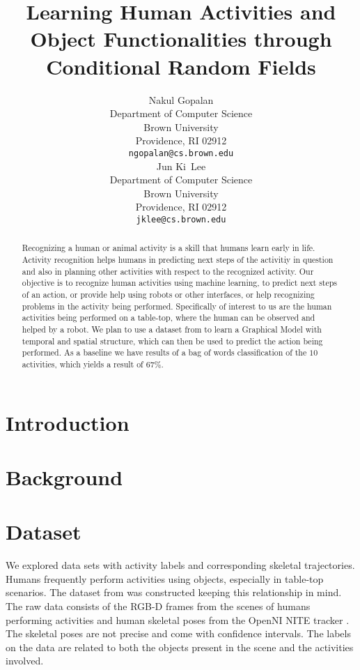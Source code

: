 \documentclass{article} %
\title{Learning Human Activities and Object Functionalities through Conditional Random Fields}
\author{
Nakul Gopalan\\
Department of Computer Science\\
Brown University\\
Providence, RI 02912 \\
\texttt{ngopalan@cs.brown.edu} \\
\And
Jun Ki~Lee\\
Department of Computer Science\\
Brown University\\
Providence, RI 02912 \\
\texttt{jklee@cs.brown.edu} \\
}
\begin{document}
\maketitle

\begin{abstract}
Recognizing a human or animal activity is a skill that humans learn early in life. Activity recognition helps humans in predicting next steps of the activitiy in question and also in planning other activities with respect to the recognized activity. Our objective is to recognize human activities using machine learning, to predict next steps of an action, or provide help using robots or other interfaces, or help recognizing problems in the activity being performed. Specifically of interest to us are the human activities being performed on a table-top, where the human can be observed and helped by a robot. We plan to use a dataset from \cite{koppula2013detectingactivitiesrgbd} to learn a Graphical Model with temporal and spatial structure, which can then be used to predict the action being performed. As a baseline we have results of a bag of words classification of the $10$ activities, which yields a result of $67\%$.
\end{abstract}

\section{Introduction}

\section{Background}

\section{Dataset}
We explored data sets with activity labels and corresponding skeletal trajectories. Humans frequently perform activities using objects, especially in table-top scenarios. The dataset from \cite{koppula2013detectingactivitiesrgbd} was constructed keeping this relationship in mind. The raw data consists of the RGB-D frames from the scenes of humans performing activities and human skeletal poses from the OpenNI NITE tracker \cite{PrimeSense2010}. The skeletal poses are not precise and come with confidence intervals. The labels on the data are related to both the objects present in the scene and the activities involved.	
\end{document}

